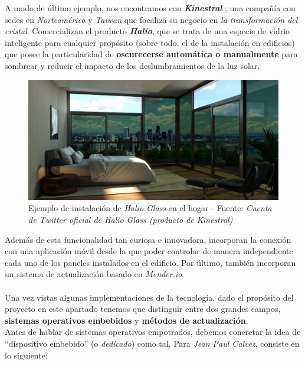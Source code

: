 A modo de último ejemplo, nos encontramos con \textbf{\textit{Kinestral}} \cite{kinestral}; una compañía con sedes en \textit{Norteamérica} y \textit{Taiwan} que focaliza su negocio en \textit{la transformación del cristal}. Comercializan el producto \textbf{\textit{Halio}}, que se trata de una especie de vidrio inteligente para cualquier propósito (sobre todo, el de la instalación en edificios) que posee la particularidad de \textbf{oscurecerse automática o manualmente} para sombrear y reducir el impacto de los deslumbramientos de la luz solar.

\begin{figure}[H]
	\centering
	\includegraphics[width=0.8\linewidth]{imagenes/halio-glass.jpeg}
	\caption{Ejemplo de instalación de \textit{Halio Glass} en el hogar - Fuente: \textit{Cuenta de \textit{Twitter} oficial de \textit{Halio Glass} (producto de \textit{Kinestral})} \cite{halio-glass}}
	\label{halio-glass}
\end{figure}

Además de esta funcionalidad tan curiosa e innovadora, incorporan la conexión con una aplicación móvil desde la que poder controlar de manera independiente cada uno de los paneles instalados en el edificio. Por último, también incorporan un sistema de actualización basado en \textit{Mender.io}.\\

\noindent\makebox[\linewidth]{\rule{\textwidth}{0.4pt}}\\

Una vez vistas algunas implementaciones de la tecnología, dado el propósito del proyecto en este apartado tenemos que distinguir entre dos grandes campos, \textbf{sistemas operativos embebidos} y \textbf{métodos de actualización}.\\

Antes de hablar de sistemas operativos empotrados, debemos concretar la idea de ``dispositivo embebido'' (o \textit{dedicado}) como tal. Para \textit{Jean Paul Calvez}, consiste en lo siguiente:

